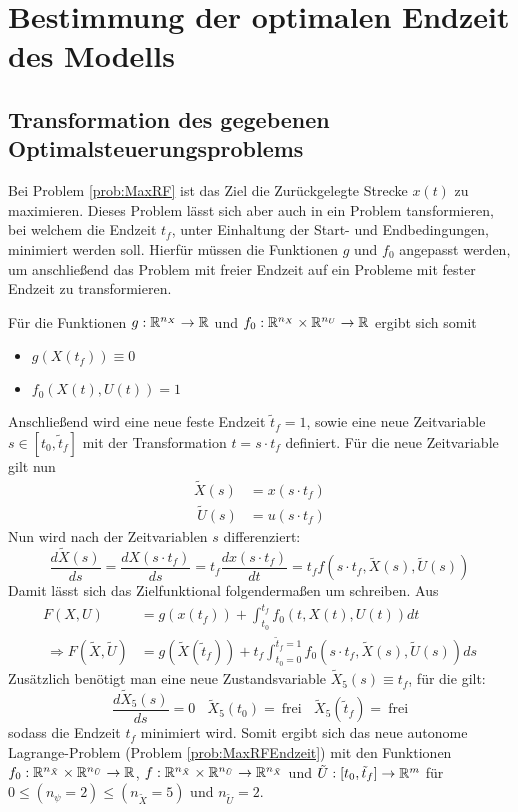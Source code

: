 \chapter{Bestimmung der optimalen Endzeit des Modells}\label{kap:OptTf}

\section{Transformation des gegebenen Optimalsteuerungsproblems}
Bei Problem \ref{prob:MaxRF} ist das Ziel die Zurückgelegte Strecke $x(t)$ zu maximieren. Dieses Problem lässt sich aber auch in ein Problem tansformieren, bei welchem die Endzeit $t_f$, unter Einhaltung der Start- und Endbedingungen, minimiert werden soll. Hierfür müssen die Funktionen $g$ und $f_0$ angepasst werden, um anschließend das Problem mit freier Endzeit auf ein Probleme mit fester Endzeit zu transformieren.

Für die Funktionen $g : \mathbb{R}^{n_X} \to \mathbb{R}$ und $f_0 : \mathbb{R}^{n_X} \times \mathbb{R}^{n_U} \to \mathbb{R}$ ergibt sich somit
\begin{itemize}
\item $g(X(t_f)) \equiv 0$
%
\item $f_0(X(t),U(t)) = 1$ 
\end{itemize}
Anschließend wird eine neue feste Endzeit $\tilde{t}_f = 1$, sowie eine neue Zeitvariable $s \in [t_0,\tilde{t}_f]$ mit der Transformation $t = s \cdot t_f$ definiert. Für die neue Zeitvariable gilt nun
\[\begin{split}
\tilde{X}(s) &= x(s \cdot t_f) \\\
\tilde{U}(s) &= u(s \cdot t_f)
\end{split}\] 
Nun wird nach der Zeitvariablen $s$ differenziert:
\[\dfrac{d \tilde{X}(s)}{ds} = \dfrac{d X(s \cdot t_f)}{ds} = t_f \dfrac{d x(s \cdot t_f)}{dt} = t_f f(s \cdot t_f,\tilde{X}(s),\tilde{U}(s)) \]
Damit lässt sich das Zielfunktional folgendermaßen um schreiben. Aus
\[\begin{split}
F(X,U) &= g(x(t_f)) + \int^{t_f}_{t_0} f_0(t,X(t),U(t)) dt \\\
\Rightarrow F(\tilde{X},\tilde{U}) &= g(\tilde{X}(\tilde{t}_f)) + t_f \int^{\tilde{t}_f = 1}_{t_0 = 0} f_0(s \cdot t_f,\tilde{X}(s),\tilde{U}(s)) ds 
\end{split}\]
Zusätzlich benötigt man eine neue Zustandsvariable $\tilde{X}_5(s) \equiv t_f$, für die gilt: \[\dfrac{d \tilde{X}_5(s)}{ds} = 0 \ \ \ \ \tilde{X}_5(t_0) =\ \text{frei} \ \ \ \ \tilde{X}_5(\tilde{t}_f) =\ \text{frei}\] sodass die Endzeit $t_f$ minimiert wird. Somit ergibt sich das neue autonome Lagrange-Problem (Problem \ref{prob:MaxRFEndzeit}) mit den Funktionen $f_0 : \mathbb{R}^{n_{\tilde{X}}} \times \mathbb{R}^{n_{\tilde{U}}} \to \mathbb{R}$, $f : \mathbb{R}^{n_{\tilde{X}}} \times \mathbb{R}^{n_{\tilde{U}}} \to \mathbb{R}^{n_{\tilde{X}}}$ und $\tilde{U} : [t_0,\tilde{t}_f] \to \mathbb{R}^m$ für $0 \leq (n_{\psi} = 2) \leq (n_{\tilde{X}} = 5)$ und $n_{\tilde{U}} = 2$.

